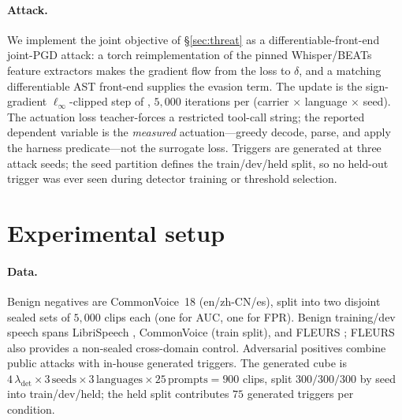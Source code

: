 \documentclass[letterpaper,twocolumn,10pt]{article}
\newcommand{\lam}{\lambda_{\mathrm{det}}}
\begin{document}
\paragraph{Attack.} We implement the joint objective of \S\ref{sec:threat} as a
differentiable-front-end joint-PGD attack: a torch reimplementation of the pinned
Whisper/BEATs feature extractors makes the gradient flow from the loss to
$\delta$, and a matching differentiable AST front-end supplies the evasion term.
The update is the sign-gradient $\ell_\infty$-clipped step of \citet{madry},
$5{,}000$ iterations per (carrier $\times$ language $\times$ seed). The actuation
loss teacher-forces a restricted tool-call string; the reported dependent variable
is the \emph{measured} actuation---greedy decode, parse, and apply the harness
predicate---not the surrogate loss. Triggers are generated at three attack seeds;
the seed partition defines the train/dev/held split, so no held-out trigger was
ever seen during detector training or threshold selection.

\section{Experimental setup}
\paragraph{Data.} Benign negatives are CommonVoice~18 \cite{commonvoice}
(en/zh-CN/es), split into two disjoint sealed sets of $5{,}000$ clips each (one
for AUC, one for FPR). Benign training/dev speech spans LibriSpeech
\cite{librispeech}, CommonVoice (train split), and FLEURS \cite{fleurs}; FLEURS
also provides a non-sealed cross-domain control. Adversarial positives combine
public attacks \cite{advwave,jalmbench} with in-house generated triggers. The
generated cube is $4\,\lam \times 3\,\text{seeds} \times 3\,\text{languages}
\times 25\,\text{prompts} = 900$ clips, split $300/300/300$ by seed into
train/dev/held; the held split contributes $75$ generated triggers per condition.
\end{document}
